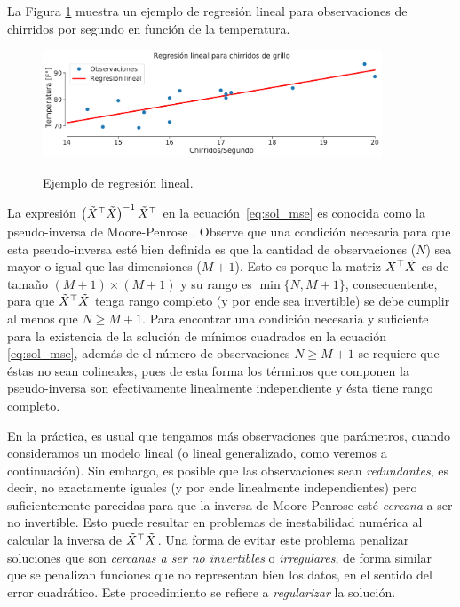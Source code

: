 La Figura \ref{fig:reg_lin_1} muestra un ejemplo de regresión lineal para observaciones de chirridos por segundo en función de la temperatura. 

\begin{figure}[H]
	\centering
	\includegraphics[width=0.9\textwidth]{img/cap1_chirridos.pdf}\\
	\caption{Ejemplo de regresión lineal.}
	\label{fig:reg_lin_1}
\end{figure}

La expresión $\left(\tilde{X}^\top\tilde{X} \right)^{-1} \tilde{X}^\top$ en la ecuación~\eqref{eq:sol_mse} es conocida como la pseudo-inversa de Moore-Penrose \cite[p.~7]{benisrael_greville_2006}. Observe que una condición necesaria para que esta pseudo-inversa esté bien definida es que la cantidad de observaciones ($N$) sea mayor o igual que las dimensiones ($M+1$). Esto es porque la matriz $\tilde{X}^\top\tilde{X}$ es de tamaño $(M+1)\times(M+1)$ y su rango es $\min \{N, M+1\}$, consecuentente, para que $\tilde{X}^\top\tilde{X}$ tenga rango completo (y por ende sea invertible) se debe cumplir al menos que $N\geq M+1$. Para encontrar una condición necesaria y suficiente para la existencia de la solución de mínimos cuadrados en la ecuación \eqref{eq:sol_mse}, además de el número de observaciones $N\geq M+1$ se requiere que éstas no sean colineales, pues de esta forma los términos que componen la pseudo-inversa son efectivamente linealmente independiente y ésta tiene rango completo. 

En la práctica, es usual que tengamos más observaciones que parámetros, cuando consideramos un modelo lineal (o lineal generalizado, como veremos a continuación). Sin embargo, es posible que las observaciones sean \emph{redundantes}, es decir, no exactamente iguales (y por ende linealmente independientes) pero suficientemente parecidas para que la inversa de Moore-Penrose esté \emph{cercana} a ser no invertible. Esto puede resultar en problemas de inestabilidad numérica al  calcular la inversa de $\tilde{X}^\top\tilde{X}$. Una forma de evitar este problema penalizar soluciones que son \emph{cercanas a ser no invertibles} o \emph{irregulares}, de forma similar que se penalizan funciones que no representan bien los datos, en el sentido del error cuadrático. Este procedimiento se refiere a \emph{regularizar} la solución.

